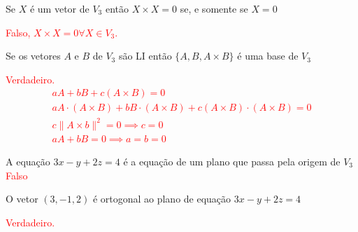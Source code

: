 \documentclass{beamer}
\begin{document}
\begin{frame}{}
  Se $X$ é um vetor de $V_3$ então $X\times X = 0$ se, e somente se $X=0$

  \textcolor{red}{Falso, $X\times X=0 \forall X\in V_3.$}

\end{frame}

\begin{frame}{}
 Se os vetores $A$ e $B$ de $V_3$ são LI então $\{A,B,A\times B\}$ é uma 
 base de $V_3$

 \textcolor{red}{Verdadeiro.
 \begin{gather*}
   aA +bB + c(A\times B)=0 \\
   aA\cdot(A\times B) +bB\cdot(A\times B) + c(A\times B)\cdot(A\times B)=0\\
   c\|A\times b\|^2 = 0 \implies c=0\\
   aA+bB=0 \implies a=b=0
 \end{gather*}}

\end{frame}

\begin{frame} 
 A equação $3x-y+ 2z =4$ é a equação de um plano que passa pela origem de $V_3$
\textcolor{red}{Falso}
 \end{frame}



\begin{frame}
  O vetor $(3,-1,2)$ é ortogonal ao plano de equação $3x-y+ 2z =4$

  \textcolor{red}{Verdadeiro.}

\end{frame}
\end{document}
